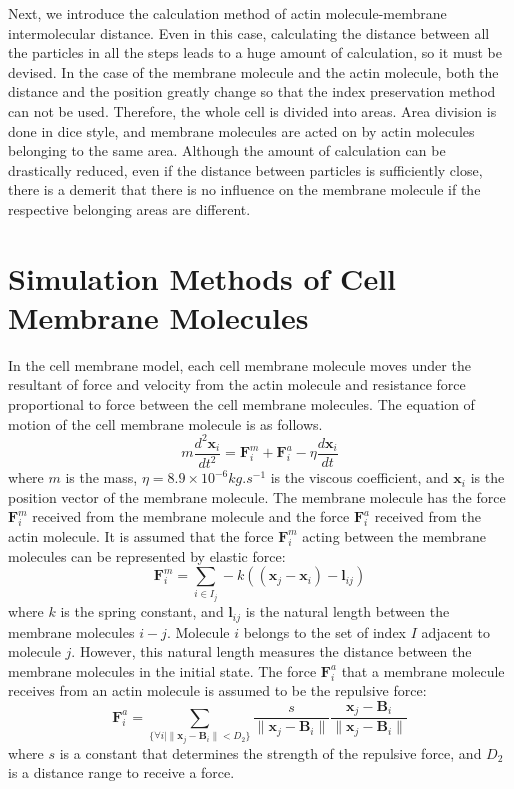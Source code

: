 \documentclass[a4paper,12pt]{book}
\begin{document}
Next, we introduce the calculation method of actin molecule-membrane intermolecular distance. Even in this case, calculating the distance between all the particles in all the steps leads to a huge amount of calculation, so it must be devised. In the case of the membrane molecule and the actin molecule, both the distance and the position greatly change so that the index preservation method can not be used. Therefore, the whole cell is divided into areas. Area division is done in dice style, and membrane molecules are acted on by actin molecules belonging to the same area. Although the amount of calculation can be drastically reduced, even if the distance between particles is sufficiently close, there is a demerit that there is no influence on the membrane molecule if the respective belonging areas are different.


\section{Simulation Methods of Cell Membrane Molecules}
In the cell membrane model, each cell membrane molecule moves under the resultant of force and velocity from the actin molecule and resistance force proportional to force between the cell membrane molecules. The equation of motion of the cell membrane molecule is as follows.
\begin{equation}
m\frac{d^2\bm{x}_i}{dt^2} = \bm{F}^m_i +  \bm{F}^a_i - \eta \frac{d\bm{x}_i}{dt}
\end{equation}
where  $m$ is the mass, $\eta = 8.9\times 10^{-6} \si{kg.s^{-1}}$ is the viscous coefficient, and $\bm{x}_i$ is the position vector of the membrane molecule. The membrane molecule has the force  $\bm{F}^m_i$ received from the membrane molecule and the force  $\bm{F}^a_i$ received from the actin molecule. It is assumed that the force  $\bm{F}^m_i$ acting between the membrane molecules can be represented by elastic force:
\begin{equation}
\bm{F}^m_i = \sum_{i \in I_j}  -k((\bm{x}_j -\bm{x}_i )-\bm{l}_{ij} )
\end{equation}
where $k$ is the spring constant, and $\bm{l}_{ij}$ is the natural length between the membrane molecules $i-j$. Molecule  $i$ belongs to the set of index $I$ adjacent to molecule $j$. However, this natural length measures the distance between the membrane molecules in the initial state. The force  $\bm{F}^a_i$ that a membrane molecule receives from an actin molecule is assumed to be the repulsive force:
\begin{equation}
\bm{F}^a_i = \sum_{\{ \forall i | \| \bm{x}_j - \bm{B}_i \|<D_2\}} \frac{s}{\|\bm{x}_j -\bm{B}_i \|} \frac{\bm{x}_j -\bm{B}_i }{\|\bm{x}_j -\bm{B}_i \|}
\end{equation}
where $s$ is a constant that determines the strength of the repulsive force, and $D_2$ is a distance range to receive a force.
\end{document}
